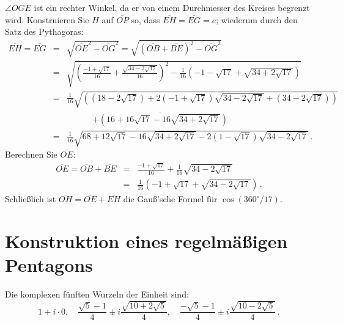 $\angle OGE$ ist ein rechter Winkel, da er von einem Durchmesser des Kreises begrenzt wird. Konstruieren Sie $H$ auf $\overline{OP}$ so, dass $\overline{EH}=\overline{EG}=e$; wiederum durch den Satz des Pythagoras:
\begin{eqnarray*}
\overline{EH}=\overline{EG}&=&\sqrt{\overline{OE}^2-\overline{OG}^2}=\sqrt{(\overline{OB}+\overline{BE})^2-\overline{OG}^2}\\
&=&\sqrt{\left(\frac{-1+\sqrt{17}}{16}+\frac{\sqrt{34-2\sqrt{17}}}{16}\right)^2-
\frac{1}{16}\left(-1-\sqrt{17}+\sqrt{34+2\sqrt{17}}\right)}
\\
&=&\frac{1}{16}\sqrt{\left(
(18-2\sqrt{17})+ 2(-1+\sqrt{17})\sqrt{34-2\sqrt{17}}+
(34-2\sqrt{17})\right)}\\
&&\quad\quad\quad\overline{
+\left(16+16\sqrt{17}-16\sqrt{34+2\sqrt{17}}\right)}\\
&=&\frac{1}{16}\sqrt{
68+12\sqrt{17}-16\sqrt{34+2\sqrt{17}}-2(1-\sqrt{17})\sqrt{34-2\sqrt{17}}
}\,.
\end{eqnarray*}
Berechnen Sie $\overline{OE}$:
\begin{eqnarray*}
\overline{OE}=\overline{OB}+\overline{BE}&=&\frac{-1+\sqrt{17}}{16}+\frac{1}{16}\sqrt{34-2\sqrt{17}}\\
&=&\frac{1}{16}\left(-1+\sqrt{17}+\sqrt{34-2\sqrt{17}}\right)\,.
\end{eqnarray*}
Schließlich ist $\overline{OH}=\overline{OE}+\overline{EH}$ die Gauß'sche Formel für $\cos (360^\circ/17)$.

\section{Konstruktion eines regelmäßigen Pentagons}\label{s.hept-pentagon}

\begin{advanced}
Die komplexen fünften Wurzeln der Einheit sind:
\[
1+i\cdot 0,\quad\frac{\sqrt{5}-1}{4}\pm i \frac{\sqrt{10+2\sqrt{5}}}{4},\quad\frac{-\sqrt{5}-1}{4}\pm i \frac{\sqrt{10-2\sqrt{5}}}{4}\,.
\]
\end{advanced}

